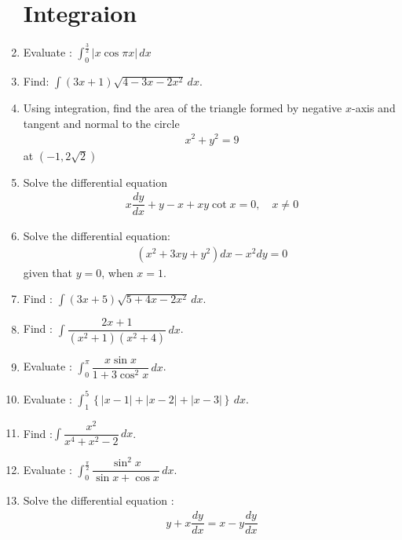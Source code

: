\documentclass[12pt,-letter paper]{article}
\theoremstyle{remark}
\providecommand{\brak}[1]{\ensuremath{\left(#1\right)}}
\providecommand{\cbrak}[1]{\ensuremath{\left\{#1\right\}}}
\providecommand{\abs}[1]{\left\vert#1\right\vert}
\begin{document}
\begin{enumerate}
            \section{Integraion}
      \item Evaluate : $\int_{0}^{\frac{3}{2}} \abs{x \cos \pi x}\,dx$
      \item Find: $\int \brak{3x +1}\sqrt{4-3x-2x^2} \,dx$.
      \item Using integration, find the area of the triangle formed by negative $x$-axis and tangent and normal to the circle
            \begin{align*}
                  x^2 + y^2 =9
            \end{align*}
            at \brak{-1,2\sqrt{2}}
      \item Solve the differential equation
            \begin{align*}
                  x\dfrac{dy}{dx} +y -x +xy \cot x= 0, \quad x\neq 0
            \end{align*}
      \item Solve the differential equation:
            \begin{align*}
                  \brak{x^2+3xy+y^2}dx -x^2dy = 0
            \end{align*}
            given that $y=0$, when $x=1$.
      \item Find : $\int \brak{3x+5}\sqrt{5+4x-2x^2}\,dx$.
      \item Find : $\int \dfrac{2x+1}{\brak{x^2+1}\brak{x^2+4}}\,dx$.
      \item Evaluate : $\int_{0}^{\pi}\dfrac{x\sin x}{1+3\cos^2 x}\,dx$.
      \item Evaluate : $\int_{1}^{5}\cbrak{\abs{x-1}+\abs{x-2}+\abs{x-3}}\,dx$.
      \item Find :$\int \dfrac{x^2}{x^4 + x^2 -2}\,dx$.
      \item Evaluate : $\int_{0}^{\frac{\pi}{2}} \dfrac{\sin^2 x}{\sin x + \cos x} \,dx$.
      \item Solve the differential equation :
            \begin{align*}
                  y+ x\dfrac{dy}{dx} = x-y\dfrac{dy}{dx}
            \end{align*}

\end{enumerate}
\end{document}
